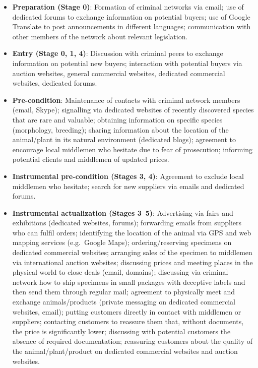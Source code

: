 \documentclass[11pt,a4paper,openany]{report}
\theoremstyle{definition}
\theoremstyle{plain}
\theoremstyle{remark}
\begin{document}
\begin{itemize}
    \item \textbf{Preparation (Stage 0)}: Formation of criminal networks via email; use of dedicated forums to exchange information on potential buyers; use of Google Translate to post announcements in different languages; communication with other members of the network about relevant legislation.
    \item \textbf{Entry (Stage 0, 1, 4)}: Discussion with criminal peers to exchange information on potential new buyers; interaction with potential buyers via auction websites, general commercial websites, dedicated commercial websites, dedicated forums.
    \item \textbf{Pre-condition}: Maintenance of contacts with criminal network members (email, Skype); signalling via dedicated websites of recently discovered species that are rare and valuable; obtaining information on specific species (morphology, breeding); sharing information about the location of the animal/plant in its natural environment (dedicated blogs); agreement to encourage local middlemen who hesitate due to fear of prosecution; informing potential clients and middlemen of updated prices.
    \item \textbf{Instrumental pre-condition (Stages 3, 4)}: Agreement to exclude local middlemen who hesitate; search for new suppliers via emails and dedicated forums.
    \item \textbf{Instrumental actualization (Stages 3--5)}: Advertising via fairs and exhibitions (dedicated websites, forums); forwarding emails from suppliers who can fulfil orders; identifying the location of the animal via GPS and web mapping services (e.g.\ Google Maps); ordering/reserving specimens on dedicated commercial websites; arranging sales of the specimen to middlemen via international auction websites; discussing prices and meeting places in the physical world to close deals (email, domains); discussing via criminal network how to ship specimens in small packages with deceptive labels and then send them through regular mail; agreement to physically meet and exchange animals/products (private messaging on dedicated commercial websites, email); putting customers directly in contact with middlemen or suppliers; contacting customers to reassure them that, without documents, the price is significantly lower; discussing with potential customers the absence of required documentation; reassuring customers about the quality of the animal/plant/product on dedicated commercial websites and auction websites.

\end{itemize}
\end{document}

